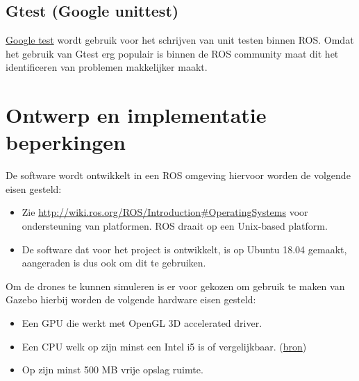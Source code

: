 \documentclass[a4paper, 11pt, oneside]{report}
\begin{document}
\subsection{Gtest (Google unittest)}
\label{inleiding:werkomgeving:gtest}

\href{https://github.com/google/googletest}{Google test} wordt gebruik voor het schrijven van unit testen binnen ROS. Omdat het gebruik van Gtest erg populair is binnen de ROS community maat dit het identificeren van problemen makkelijker maakt. 




\section{Ontwerp en implementatie beperkingen}
\label{inleiding:ontwerpberkingen}

De software wordt ontwikkelt in een ROS omgeving hiervoor worden de volgende eisen gesteld:
\begin{itemize}
	\item  Zie \href{http://wiki.ros.org/ROS/Introduction\#Operating\_Systems}{http://wiki.ros.org/ROS/Introduction\#Operating\textunderscore Systems} voor ondersteuning van platformen. ROS draait op een Unix-based platform.
	\item De software dat voor het project is ontwikkelt, is op Ubuntu 18.04 gemaakt, aangeraden is dus ook om dit te gebruiken.
\end{itemize}

Om de drones te kunnen simuleren is er voor gekozen om gebruik te maken van Gazebo hierbij worden de volgende hardware eisen gesteld:

\begin{itemize}
	\item Een GPU die werkt met OpenGL 3D accelerated driver.
	\item Een CPU welk op zijn minst een Intel i5 is of vergelijkbaar. (\href{http://gazebosim.org/tutorials?tut=guided_b1&cat=}{bron})
	\item Op zijn minst 500 MB vrije opslag ruimte.
\end{itemize}
\end{document}
